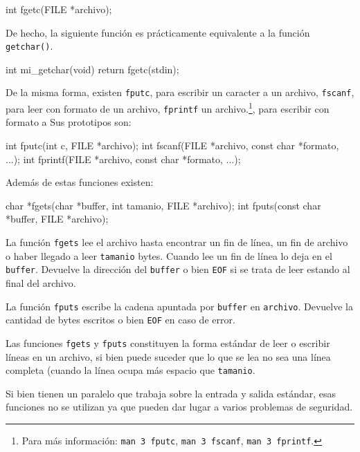 \begin{codigo-c-plano}
int fgetc(FILE *archivo);
\end{codigo-c-plano}

De hecho, la siguiente función es prácticamente equivalente a la función
\lstinline!getchar()!.

\begin{codigo-c-plano}
int mi_getchar(void)
{
	return fgetc(stdin);
}
\end{codigo-c-plano}

De la misma forma, existen \lstinline!fputc!, para escribir un caracter a un
archivo, \lstinline!fscanf!, para leer con formato de un archivo,
\lstinline!fprintf!  un archivo.\footnote{Para más información: \texttt{man
3 fputc}, \texttt{man 3 fscanf}, \texttt{man 3 fprintf}.}, para escribir con
formato a Sus prototipos son:

\begin{codigo-c-plano}
int fputc(int c, FILE *archivo);
int fscanf(FILE *archivo, const char *formato, ...);
int fprintf(FILE *archivo, const char *formato, ...);
\end{codigo-c-plano}

Además de estas funciones existen:

\begin{codigo-c-plano}
char *fgets(char *buffer, int tamanio, FILE *archivo);
int fputs(const char *buffer, FILE *archivo);
\end{codigo-c-plano}

La función \lstinline!fgets! lee el archivo hasta encontrar un fin de línea,
un fin de archivo o haber llegado a leer \lstinline!tamanio! bytes. Cuando lee
un fin de línea lo deja en el \lstinline!buffer!. Devuelve la dirección del
\lstinline!buffer! o bien \lstinline!EOF! si se trata de leer estando al final
del archivo.

La función \lstinline!fputs! escribe la cadena apuntada por \lstinline!buffer!
en \lstinline!archivo!. Devuelve la cantidad de bytes escritos o bien
\lstinline!EOF! en caso de error.

Las funciones \lstinline!fgets! y \lstinline!fputs! constituyen la forma
estándar de leer o escribir líneas en un archivo, si bien puede suceder que lo
que se lea no sea una línea completa (cuando la línea ocupa más espacio que
\lstinline!tamanio!.

Si bien tienen un paralelo que trabaja sobre la entrada y salida estándar,
esas funciones no se utilizan ya que pueden dar lugar a varios problemas de
seguridad.

